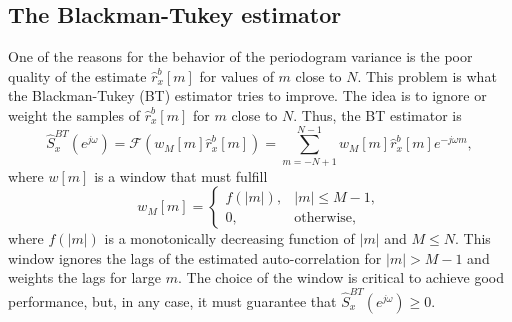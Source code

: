 \subsection{The Blackman-Tukey estimator}

One of the reasons for the behavior of the periodogram variance is the poor quality of the estimate $\hat{r}_{x}^{b}[m]$ for values of $m$ close to $N$. This problem is what the Blackman-Tukey (BT) estimator tries to improve. The idea is to ignore or weight the samples of $\hat{r}_{x}^{b}[m]$ for $m$ close to $N$. Thus, the BT estimator is
\begin{equation}
\label{eq:BT_definition}
\hat{S}_x^{BT}(e^{j \omega}) = \mathcal{F}(w_M[m] \hat{r}_{x}^{b}[m]) = \sum_{m = -N + 1}^{N-1} w_M[m] \hat{r}_{x}^{b}[m] e^{-j \omega m},
\end{equation}
where $w[m]$ is a window that must fulfill
\begin{equation*}
w_{M}[m] = \begin{cases} f(|m|), & |m| \leq M-1, \\
0, & \text{otherwise},
\end{cases}
\end{equation*}
where $f(|m|)$ is a monotonically decreasing function of $|m|$ and $M \leq N$. This window ignores the lags of the estimated auto-correlation for $|m|>M-1$ and weights  the lags for large $m$. The choice of the window  is critical to achieve good performance, but, in any case, it must guarantee that $\hat{S}_x^{BT}(e^{j \omega}) \geq 0$.

